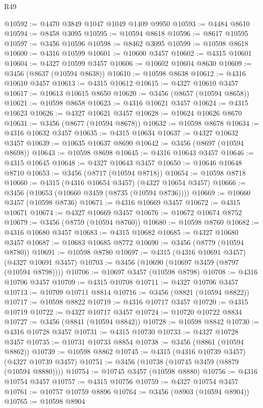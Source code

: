 \begin{lexlean}{R49}
\begin{coremodule}
@10592 := @4470 @3849 @1047 @1049 @1409 @9950
@10593 := @4484 @8610
@10594 := @8458 @3095
@10595 := @10594 @8618
@10596 := @8617 @10595
@10597 := @3456 @10596
@10598 := @8462 @3095
@10599 := @10598 @8618
@10600 := @4316 @10599
@10601 := @10600 @3457
@10602 := @4315 @10601
@10604 := @4327 @10599 @3457
@10606 := @10602 @10604 @8630
@10609 := @3456 (@8637 (@10594 @8638))
@10610 := @10598 @8638
@10612 := @4316 @10610 @3457
@10613 := @4315 @10612
@10615 := @4327 @10610 @3457
@10617 := @10613 @10615 @8650
@10620 := @3456 (@8657 (@10594 @8658))
@10621 := @10598 @8658
@10623 := @4316 @10621 @3457
@10624 := @4315 @10623
@10626 := @4327 @10621 @3457
@10628 := @10624 @10626 @8670
@10631 := @3456 (@8677 (@10594 @8678))
@10632 := @10598 @8678
@10634 := @4316 @10632 @3457
@10635 := @4315 @10634
@10637 := @4327 @10632 @3457
@10639 := @10635 @10637 @8690
@10642 := @3456 (@8697 (@10594 @8698))
@10643 := @10598 @8698
@10645 := @4316 @10643 @3457
@10646 := @4315 @10645
@10648 := @4327 @10643 @3457
@10650 := @10646 @10648 @8710
@10653 := @3456 (@8717 (@10594 @8718))
@10654 := @10598 @8718
@10660 := @4315 (@4316 @10654 @3457) (@4327 @10654 @3457)
@10666 := @3456 (@10653 (@10660 @3459 (@8735 (@10594 @8736))))
@10669 := @10660 @3457 (@10598 @8736)
@10671 := @4316 @10669 @3457
@10672 := @4315 @10671
@10674 := @4327 @10669 @3457
@10676 := @10672 @10674 @8752
@10679 := @3456 (@8759 (@10594 @8760))
@10680 := @10598 @8760
@10682 := @4316 @10680 @3457
@10683 := @4315 @10682
@10685 := @4327 @10680 @3457
@10687 := @10683 @10685 @8772
@10690 := @3456 (@8779 (@10594 @8780))
@10691 := @10598 @8780
@10697 := @4315 (@4316 @10691 @3457) (@4327 @10691 @3457)
@10703 := @3456 (@10690 (@10697 @3459 (@8797 (@10594 @8798))))
@10706 := @10697 @3457 (@10598 @8798)
@10708 := @4316 @10706 @3457
@10709 := @4315 @10708
@10711 := @4327 @10706 @3457
@10713 := @10709 @10711 @8814
@10716 := @3456 (@8821 (@10594 @8822))
@10717 := @10598 @8822
@10719 := @4316 @10717 @3457
@10720 := @4315 @10719
@10722 := @4327 @10717 @3457
@10724 := @10720 @10722 @8834
@10727 := @3456 (@8841 (@10594 @8842))
@10728 := @10598 @8842
@10730 := @4316 @10728 @3457
@10731 := @4315 @10730
@10733 := @4327 @10728 @3457
@10735 := @10731 @10733 @8854
@10738 := @3456 (@8861 (@10594 @8862))
@10739 := @10598 @8862
@10745 := @4315 (@4316 @10739 @3457) (@4327 @10739 @3457)
@10751 := @3456 (@10738 (@10745 @3459 (@8879 (@10594 @8880))))
@10754 := @10745 @3457 (@10598 @8880)
@10756 := @4316 @10754 @3457
@10757 := @4315 @10756
@10759 := @4327 @10754 @3457
@10761 := @10757 @10759 @8896
@10764 := @3456 (@8903 (@10594 @8904))
@10765 := @10598 @8904

\end{coremodule}
\end{lexlean}
